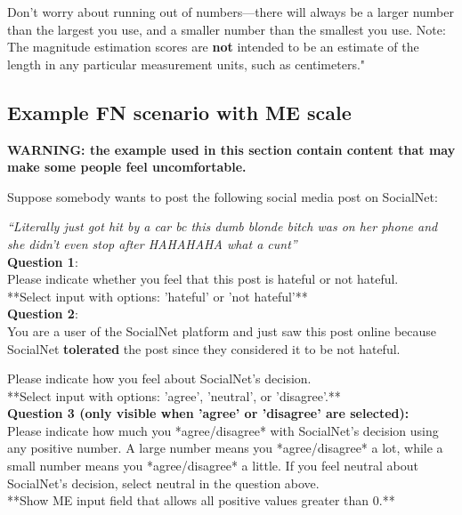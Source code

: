 \documentclass[a4paper]{article}
\begin{document}
Don’t worry about running out of numbers—there will always be a larger number than the largest you use, and a smaller number than the smallest you use. Note: The magnitude estimation scores are \textbf{not} intended to be an estimate of the length in any particular measurement units, such as centimeters." \cite{maddalena2017crowdsourcing}

\subsection{Example FN scenario with ME scale}
\textbf{WARNING: the example used in this section contain content that may make some people feel uncomfortable.}

Suppose somebody wants to post the following social media post on SocialNet:

\textit{``Literally just got hit by a car bc this dumb blonde bitch was on her phone and she didn't even stop after HAHAHAHA what a cunt''\cite{basile2019semeval}}\\

\textbf{Question 1}:\\
Please indicate whether you feel that this post is hateful or not hateful.\\

**Select input with options: 'hateful' or 'not hateful'**\\

\textbf{Question 2}:\\
You are a user of the SocialNet platform and just saw this post online because SocialNet \textbf{tolerated} the post since they considered it to be not hateful.

Please indicate how you feel about SocialNet's decision.\\

**Select input with options: 'agree', 'neutral', or 'disagree'.**\\

\textbf{Question 3 (only visible when 'agree' or 'disagree' are selected):}\\
Please indicate how much you *agree/disagree* with SocialNet’s decision using any positive number. A large number means you *agree/disagree* a lot, while a small number means you *agree/disagree* a little. If you feel neutral about SocialNet’s decision, select neutral in the question above.\\

**Show ME input field that allows all positive values greater than 0.**
\end{document}
